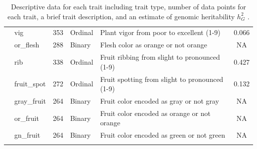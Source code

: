 \documentclass[utf8]{FrontiersinHarvard} %
\begin{document}
\begin{center}
\begin{longtable}{l l l l p{5cm} c}
& vig & 353 &Ordinal & Plant vigor from poor to excellent (1-9)& 0.066 \\
& or\_flesh & 288 &Binary & Flesh color as orange or not orange & NA \\
& rib & 338 &Ordinal & Fruit ribbing from slight to pronounced (1-9) & 0.427 \\
& fruit\_spot & 272 &Ordinal & Fruit spotting from slight to pronounced (1-9) & 0.132 \\
& gray\_fruit & 264 &Binary & Fruit color encoded as gray or not gray & NA \\
& or\_fruit & 264 &Binary & Fruit color encoded as orange or not orange & NA \\
& gn\_fruit & 264 &Binary & Fruit color encoded as green or not green & NA \\
\hline
	\caption{Descriptive data for each trait including trait type, number of data points for each trait, a brief trait description, and an estimate of genomic heritability {$h_{G}^{2}$} . \label{tbl:3}}
\end{longtable}
\end{center}
\end{document}
